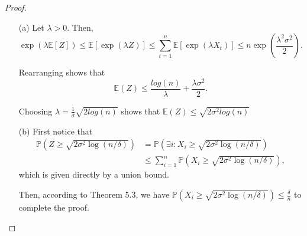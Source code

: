 \begin{proof}
	\begin{itemize}
		\item[(a)] Let $\lambda >0$.
		Then,
		\begin{equation*}
			\exp(\lambda \mathbb{E}[Z]) \leq \mathbb{E}[\exp(\lambda Z)] \leq \sum_{t=1}^n \mathbb{E}[\exp(\lambda X_t)] \leq n \exp(\frac{\lambda^2 \sigma^2}{2}).
		\end{equation*}
		
		Rearranging shows that
		\begin{equation*}
			\mathbb{E}(Z) \leq \frac{log(n)}{\lambda} + \frac{\lambda \sigma^2}{2}.
		\end{equation*}
	
		Choosing $\lambda = \frac{1}{\sigma} \sqrt{2log(n)}$ shows that $\mathbb{E}(Z) \leq \sqrt{2\sigma^2 log(n)}$
		
		\item[(b)] First notice that
		\begin{equation*}
			\begin{aligned}
				\mathbb{P}\left(Z \geq \sqrt{2 \sigma^{2} \log (n / \delta)}\right)
				&= \mathbb{P}\left(\exists i: X_i \geq \sqrt{2 \sigma^{2} \log (n / \delta)}\right)\\
				&\leq \sum_{i=1}^n \mathbb{P}\left(X_i \geq \sqrt{2 \sigma^{2} \log (n / \delta)}\right),
			\end{aligned}
		\end{equation*} 
		which is given directly by a union bound.

		Then, according to Theorem 5.3, we have $\mathbb{P}\left(X_i \geq \sqrt{2 \sigma^{2} \log (n / \delta)}\right)
		\leq \frac{\delta}{n}$ to complete the proof.
	\end{itemize}
\end{proof}

